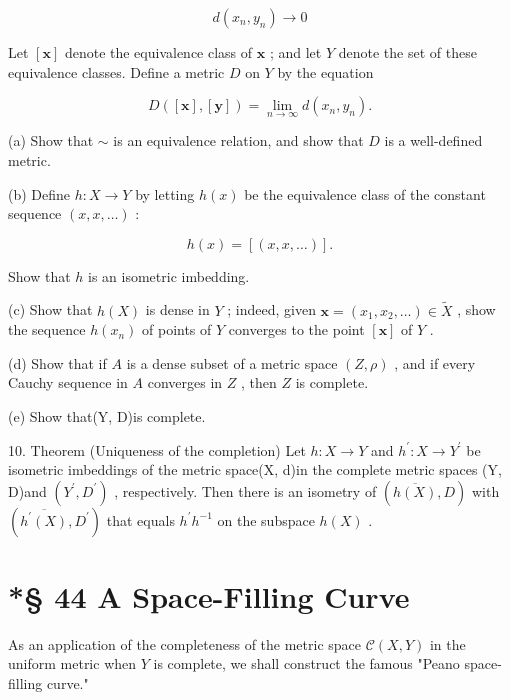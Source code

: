 \[
d\left( {{x}_{n},{y}_{n}}\right)  \rightarrow  0
\]

Let \(\left\lbrack  \mathbf{x}\right\rbrack\) denote the equivalence class of \(\mathbf{x}\) ; and let \(Y\) denote the set of these equivalence classes. Define a metric \(D\) on \(Y\) by the equation

\[
D\left( {\left\lbrack  \mathbf{x}\right\rbrack  ,\left\lbrack  \mathbf{y}\right\rbrack  }\right)  = \mathop{\lim }\limits_{{n \rightarrow  \infty }}d\left( {{x}_{n},{y}_{n}}\right) .
\]

(a) Show that \(\sim\) is an equivalence relation, and show that \(D\) is a well-defined metric.

(b) Define \(h : X \rightarrow  Y\) by letting \(h\left( x\right)\) be the equivalence class of the constant sequence \(\left( {x,x,\ldots }\right)\) :

\[
h\left( x\right)  = \left\lbrack  \left( {x,x,\ldots }\right) \right\rbrack  .
\]

Show that \(h\) is an isometric imbedding.

(c) Show that \(h\left( X\right)\) is dense in \(Y\) ; indeed, given \(\mathbf{x} = \left( {{x}_{1},{x}_{2},\ldots }\right)  \in  \widetilde{X}\) , show the sequence \(h\left( {x}_{n}\right)\) of points of \(Y\) converges to the point \(\left\lbrack  \mathbf{x}\right\rbrack\) of \(Y\) .

(d) Show that if \(A\) is a dense subset of a metric space \(\left( {Z,\rho }\right)\) , and if every Cauchy sequence in \(A\) converges in \(Z\) , then \(Z\) is complete.

(e) Show that(Y, D)is complete.

10. Theorem (Uniqueness of the completion) Let \(h : X \rightarrow  Y\) and \({h}^{\prime } : X \rightarrow  {Y}^{\prime }\) be isometric imbeddings of the metric space(X, d)in the complete metric spaces (Y, D)and \(\left( {{Y}^{\prime },{D}^{\prime }}\right)\) , respectively. Then there is an isometry of \(\left( {\overline{h\left( X\right) },D}\right)\) with \(\left( {\overline{{h}^{\prime }\left( X\right) },{D}^{\prime }}\right)\) that equals \({h}^{\prime }{h}^{-1}\) on the subspace \(h\left( X\right)\) .

\section*{*§ 44 A Space-Filling Curve}

As an application of the completeness of the metric space \(\mathcal{C}\left( {X,Y}\right)\) in the uniform metric when \(Y\) is complete, we shall construct the famous "Peano space-filling curve."

